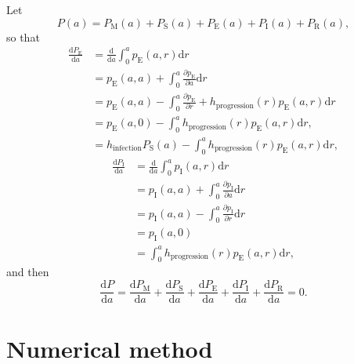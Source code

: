 \documentclass[12pt]{article}
\newcommand{\md}{\mathrm{d}}
\begin{document}
Let
\begin{equation}
  P(a) = P_{\mathrm{M}}(a) + P_{\mathrm{S}}(a)
  + P_{\mathrm{E}}(a) + P_{\mathrm{I}}(a)
  + P_{\mathrm{R}}(a),
\end{equation}
so that
\begin{equation}
  \begin{split}
    \frac{\md P_{\mathrm{E}}}{\md a}
    &= \frac{\md}{\md a}  \int_0^a p_{\mathrm{E}}(a, r) \md r
    \\
    &= p_{\mathrm{E}}(a, a)
    + \int_0^a \frac{\partial p_{\mathrm{E}}}{\partial a} \md r
    \\
    &= p_{\mathrm{E}}(a, a)
    - \int_0^a \frac{\partial p_{\mathrm{E}}}{\partial r}
    + h_{\mathrm{progression}}(r) p_{\mathrm{E}}(a, r) \md r
    \\
    &= p_{\mathrm{E}}(a, 0)
    - \int_0^a h_{\mathrm{progression}}(r) p_{\mathrm{E}}(a, r) \md r,
    \\
    &= h_{\mathrm{infection}} P_{\mathrm{S}}(a)
    - \int_0^a h_{\mathrm{progression}}(r) p_{\mathrm{E}}(a, r) \md r,
  \end{split}
\end{equation}
\begin{equation}
  \begin{split}
    \frac{\md P_{\mathrm{I}}}{\md a}
    &= \frac{\md}{\md a}  \int_0^a p_{\mathrm{I}}(a, r) \md r
    \\
    &= p_{\mathrm{I}}(a, a)
    + \int_0^a \frac{\partial p_{\mathrm{I}}}{\partial a} \md r
    \\
    &= p_{\mathrm{I}}(a, a)
    - \int_0^a \frac{\partial p_{\mathrm{I}}}{\partial r} \md r
    \\
    &= p_{\mathrm{I}}(a, 0)
    \\
    &= \int_0^a h_{\mathrm{progression}}(r) p_{\mathrm{E}}(a, r) \md r,
  \end{split}
\end{equation}
and then
\begin{equation}
  \frac{\md P}{\md a} =
  \frac{\md P_{\mathrm{M}}}{\md a}
  + \frac{\md P_{\mathrm{S}}}{\md a}
  + \frac{\md P_{\mathrm{E}}}{\md a}
  + \frac{\md P_{\mathrm{I}}}{\md a}
  + \frac{\md P_{\mathrm{R}}}{\md a}
  = 0.
\end{equation}


\section{Numerical method}
\end{document}
